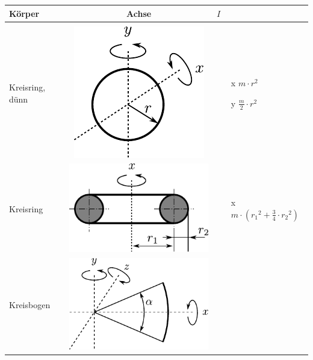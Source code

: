\begin{table}[h!]
\centering
\begin{tabular}{m{2cm} c m{}}
Körper	& Achse	& $I$ \\
\hline
& & \\
Kreisring, dünn &
	\begin{minipage}{0.3\textwidth}
	\centering
	\includegraphics[scale=\traegscale]{traeg-kreisring-duenn.pdf}
	\end{minipage} &
		\begin{itemize}
		\item[x] $m \cdot r^2$
		\item[y] $\frac{m}{2} \cdot r^2$
		\end{itemize} \\
Kreisring &
	\begin{minipage}{0.3\textwidth}
	\centering
	\includegraphics[scale=\traegscale]{traeg-kreisring.pdf}
	\end{minipage} &
		\begin{itemize}
			\item[x] $m \cdot \left({r_1}^2 + \frac{3}{4}
				\cdot {r_2}^2\right)$
		\end{itemize} \\
Kreisbogen &
	\begin{minipage}{0.3\textwidth}
	\centering
	\includegraphics[scale=\traegscale]{traeg-kreisbogen.pdf}

\end{minipage}
\end{tabular}
\end{table}
